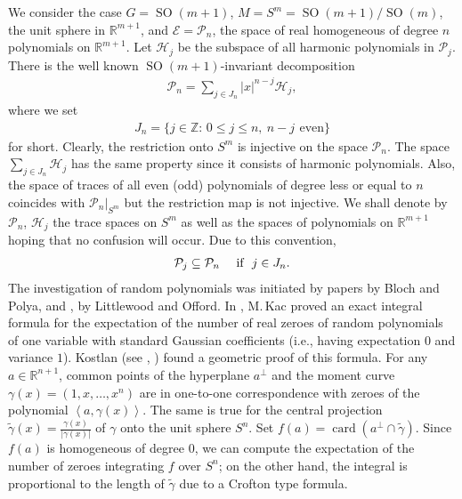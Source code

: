 \documentclass[10pt]{amsart}
\theoremstyle{remark}
\let\td=\tilde
\begin{document}
We consider the case $G={\mathop{\mathrm{SO}}}(m+1)$, $M=S^m={\mathop{\mathrm{SO}}}(m+1)/{\mathop{\mathrm{SO}}}(m)$, the
unit sphere in ${\mathbb{R}}^{m+1}$, and ${\mathcal{E}}={\mathcal{P}}_n$, the space of real
homogeneous of degree $n$ polynomials on ${\mathbb{R}}^{m+1}$. Let ${\mathcal{H}}_j$
be the subspace of all harmonic polynomials in ${\mathcal{P}}_j$. There is
the well known
 ${\mathop{\mathrm{SO}}}(m+1)$-invariant decomposition
\begin{eqnarray}\label{harmdec}
{\mathcal{P}}_n
=\sum_{j\in J_n}|x|^{n-j}{\mathcal{H}}_{j},
\end{eqnarray}
where we set
\begin{eqnarray}\label{defjnz}
J_n=\{j\in{\mathbb{Z}}:\,0\le j\leq n,~n-j~\,\text{even}\}
\end{eqnarray}
for short. Clearly,  the restriction onto $S^m$ is injective on
the space ${\mathcal{P}}_n$. The space $\sum_{j\in J_n}{\mathcal{H}}_j$ has the same
property since it consists of harmonic polynomials. Also, the
space of traces of all even (odd) polynomials of degree less or
equal to $n$ coincides with ${\mathcal{P}}_n\big|_{S^m}$ but the restriction
map is not injective. We shall denote by ${\mathcal{P}}_n$, ${\mathcal{H}}_j$ the
trace spaces on $S^m$ as well as the spaces of polynomials on
${\mathbb{R}}^{m+1}$ hoping that no confusion will occur. Due to this
convention,
\begin{eqnarray*}
{\mathcal{P}}_j\subseteq{\mathcal{P}}_n~~~~\hbox{\rm if}~~j\in J_n.
\end{eqnarray*}
The investigation of random polynomials was initiated by papers
\cite{BP} by Bloch and Polya, and \cite{LO38}, \cite{LO39} by
Littlewood and Offord. In \cite{Kac}, M.\,Kac proved an exact
integral formula for the expectation of the number of real zeroes
of random polynomials of one variable with standard Gaussian
coefficients (i.e., having expectation $0$ and variance $1$).
Kostlan (see \cite{Ko93}, \cite{EK95}) found a geometric proof of
this formula. For any $a\in{\mathbb{R}}^{n+1}$, common points of the
hyperplane $a^\bot$ and the moment curve ${{\mathord{\gamma}}}(x)=(1,x,\dots,x^n)$
are in one-to-one correspondence with zeroes of the polynomial
${\left<{a},{{{\mathord{\gamma}}}(x)}\right>}$. The same is true for the central projection
$\td{{\mathord{\gamma}}}(x)=\frac{{{\mathord{\gamma}}}(x)}{|{{\mathord{\gamma}}}(x)|}$ of ${{\mathord{\gamma}}}$ onto the unit sphere
$S^n$. Set  $f(a)={\mathop{\mathrm{card}}}(a^\bot\mathop\cap\td{{\mathord{\gamma}}})$. Since $f(a)$ is
homogeneous of degree $0$, we can compute the expectation of the
number of zeroes integrating $f$ over $S^n$; on the other hand,
the integral is proportional to the length of $\td{{\mathord{\gamma}}}$ due to a
Crofton type formula.
\end{document}
